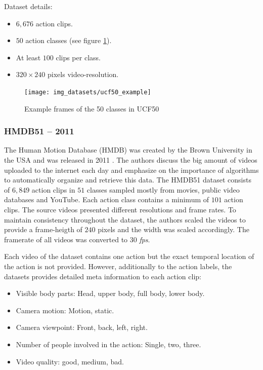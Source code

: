 Dataset details: \cite{kang_review_2016}
\begin{itemize}
    \item $6,676$ action clips.
    \item $50$ action classes (see figure \ref{fig:ucf50_example}).
    \item At least $100$ clips per class.
    \item $320 \times 240$ pixels video-resolution.
\end{itemize}

\begin{figure}[H]
    \centering
    \texttt{[image: img\_datasets/ucf50\_example]}
    \caption{Example frames of the 50 classes in UCF50 \cite{reddy_recognizing_2013}}
    \label{fig:ucf50_example}
\end{figure}


\subsubsection{HMDB51 -- 2011}
\cite{kuehne_hmdb:_2011}
The Human Motion Database (HMDB) was created by the Brown University in the USA and was released in 2011 \cite{kuehne_hmdb:_2011}.
The authors discuss the big amount of videos uploaded to the internet each day and emphasize on the importance of algorithms to automatically organize and retrieve this data.
The HMDB51 dataset consists of $6,849$ action clips in $51$ classes sampled mostly from movies, public video databases and YouTube.
Each action class contains a minimum of $101$ action clips.
The source videos presented different resolutions and frame rates.
To maintain consistency throughout the dataset, the authors scaled the videos to provide a frame-heigth of $240$ pixels and the width was scaled accordingly.
The framerate of all videos was converted to $30$ \textit{fps}.

Each video of the dataset contains one action but the exact temporal location of the action is not provided.
However, additionally to the action labels, the datasets provides detailed meta information to each action clip: \cite{_serre_????}
\begin{itemize}
    \item Visible body parts: Head, upper body, full body, lower body.
    \item Camera motion: Motion, static.
    \item Camera viewpoint: Front, back, left, right.
    \item Number of people involved in the action: Single, two, three.
    \item Video quality: good, medium, bad.
\end{itemize}

